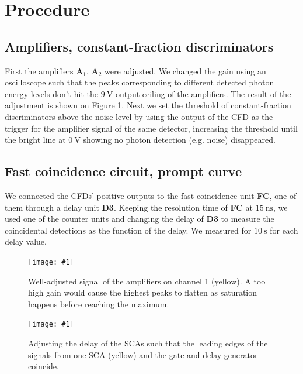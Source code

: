 \documentclass[twocolumn]{article}
\newcommand{\insertFigure}[1]{%
   \texttt{[image: \#1]}%
}
\begin{document}
\section{Procedure}
\subsection{Amplifiers, constant-fraction discriminators}
First the amplifiers \textbf{A$_1$}, \textbf{A$_2$} were adjusted. We changed the gain using an oscilloscope such that the peaks corresponding to different detected photon energy levels don't hit the $\SI{9}{\volt}$ output ceiling of the amplifiers. The result of the adjustment is shown on Figure \ref{fig:amp}. Next we set the threshold of constant-fraction discriminators above the noise level by using the output of the CFD as the trigger for the amplifier signal of the same detector, increasing the threshold until the bright line at $\SI{0}{\volt}$ showing no photon detection (e.g. noise) disappeared. 
\subsection{Fast coincidence circuit, prompt curve}
We connected the CFDs' positive outputs to the fast coincidence unit \textbf{FC}, one of them through a delay unit \textbf{D3}. Keeping the resolution time of \textbf{FC} at $\SI{15}{\nano\second}$, we used one of the counter units and changing the delay of \textbf{D3} to measure the coincidental detections as the function of the delay. We measured for $\SI{10}{\second}$ for each delay value.
\begin{figure}
\centering
\insertFigure{./screenshots/SC08_cropped.png}
\caption{Well-adjusted signal of the amplifiers on channel 1 (yellow). A too high gain would cause the highest peaks to flatten as saturation happens before reaching the maximum.} 
\label{fig:amp}
\end{figure}
\begin{figure}
\centering
\insertFigure{./screenshots/SC07_cropped.png}
\caption{Adjusting the delay of the SCAs such that the leading edges of the signals from one SCA (yellow) and the gate and delay generator coincide.}
\label{fig:sca-overlap}
\end{figure}
\end{document}
